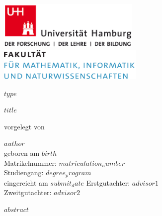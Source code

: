 \documentclass[a4paper,12pt]{article}
\begin{document}
\thispagestyle{empty}

\begin{titlepage}

\includegraphics[width=6.8cm]{images/uhh_logo.png}
\hspace{2cm}
\includegraphics[width=7cm]{images/min_logo.png}

\begin{center}\large
  \vfill
	{\Large{$type$}\\\vspace{0.5cm}\par\bigskip}
	\makeatletter
	{\LARGE\textsf{\textbf{$title$}}\par}
	\makeatother
	\vfill
  vorgelegt von \\\vspace{0.5cm}
  \par\bigskip
	\makeatletter
  \textbf{$author$} \\
  \makeatother
  geboren am $birth$ \\
  Matrikelnummer: $matriculation_number$ \\
  Studiengang: $degree_program$ \\
  \vfill
	\makeatletter
	eingereicht am $submit_date$
	\makeatother
	\vfill
  Erstgutachter: $advisor1$ \\
  Zweitgutachter: $advisor2$ \\

\end{center}
\end{titlepage}

\newpage
\renewcommand{\contentsname}{Inhaltsverzeichnis}
\tableofcontents
\clearpage

\newpage
$abstract$
\pagestyle{plain}
\setcounter{page}{1}    		%
\end{document}
